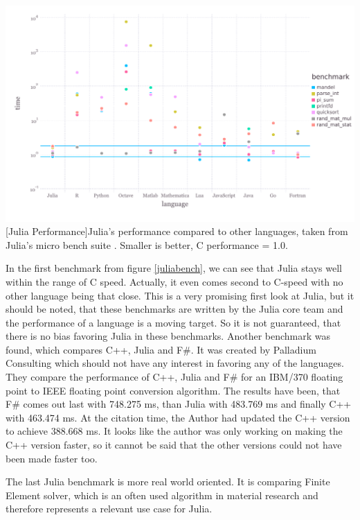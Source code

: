 \vspace{1em}
\begin{minipage}{\linewidth}
    \centering
    \includegraphics[width=0.9\linewidth]{graphics/juliabench.pdf}
    [Julia Performance]{Julia's performance compared to other languages, taken from Julia's micro bench suite \cite{JuliaBench}. Smaller is better, C performance = 1.0.}
    \label{fig:juliabench}
\end{minipage}

In the first benchmark from figure \cref{juliabench}, we can see that Julia stays well within the range of C speed. 
Actually, it even comes second to C-speed with no other language being that close.
This is a very promising first look at Julia, but it should be noted, that these benchmarks are written by the Julia core team and the performance of a language is a moving target.
So it is not guaranteed, that there is no bias favoring Julia in these benchmarks.
Another benchmark was found, which compares C++, Julia and F\#. It was created by Palladium Consulting\cite{PalladiumConsulting} which should not have any interest in favoring any of the languages.
They compare the performance of C++, Julia and F\# for an IBM/370 floating point to IEEE floating point conversion algorithm.
The results\cite{JuliaFSCpp} have been, that F\# comes out last with 748.275 ms, than Julia with 483.769 ms and finally C++ with 463.474 ms. 
At the citation time, the Author had updated the C++ version to achieve 388.668 ms. 
It looks like the author was only working on making the C++ version faster, so it cannot be said that the other versions could not have been made faster too.

The last Julia benchmark is more real world oriented. 
It is comparing Finite Element solver, which is an often used algorithm in material research and therefore represents a relevant use case for Julia.

